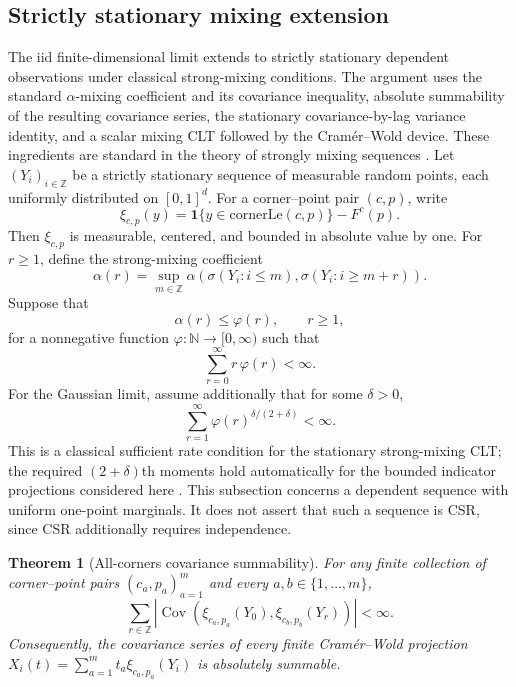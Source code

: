 \documentclass[pdflatex]{sn-jnl}
\theoremstyle{thmstyleone}
\newtheorem{theorem}{Theorem}[section]
\theoremstyle{thmstyletwo}
\theoremstyle{thmstylethree}
\newcommand{\Z}{\mathbb{Z}}
\newcommand{\N}{\mathbb{N}}
\DeclareMathOperator{\Cov}{Cov}
\begin{document}
\subsection{Strictly stationary mixing extension}\label{sec:mixing-extension}

The iid finite-dimensional limit extends to strictly stationary dependent observations under classical strong-mixing conditions. The argument uses the standard $\alpha$-mixing coefficient and its covariance inequality, absolute summability of the resulting covariance series, the stationary covariance-by-lag variance identity, and a scalar mixing CLT followed by the Cram\'er--Wold device. These ingredients are standard in the theory of strongly mixing sequences \cite{Ibragimov1962,Doukhan1994,Bradley2005,Rio2017}. Let $(Y_i)_{i\in\Z}$ be a strictly stationary sequence of measurable random points, each uniformly distributed on $[0,1]^d$. For a corner--point pair $(c,p)$, write
\[
  \xi_{c,p}(y)=\mathbf 1\{y\in\mathrm{cornerLe}(c,p)\}-F^c(p).
\]
Then $\xi_{c,p}$ is measurable, centered, and bounded in absolute value by one. For $r\ge1$, define the strong-mixing coefficient
\[
  \alpha(r)=\sup_{m\in\Z}
  \alpha\!\left(
    \sigma(Y_i:i\le m),
    \sigma(Y_i:i\ge m+r)
  \right).
\]
Suppose that
\begin{equation}\label{eq:mixing-rate}
  \alpha(r)\le\varphi(r),\qquad r\ge1,
\end{equation}
for a nonnegative function $\varphi:\N\to[0,\infty)$ such that
\begin{equation}\label{eq:weighted-mixing-summability}
  \sum_{r=0}^{\infty}r\,\varphi(r)<\infty.
\end{equation}
For the Gaussian limit, assume additionally that for some $\delta>0$,
\begin{equation}\label{eq:mixing-clt-summability}
  \sum_{r=1}^{\infty}\varphi(r)^{\delta/(2+\delta)}<\infty.
\end{equation}
This is a classical sufficient rate condition for the stationary strong-mixing CLT; the required $(2+\delta)$th moments hold automatically for the bounded indicator projections considered here \cite{Ibragimov1962,Doukhan1994,Rio2017}. This subsection concerns a dependent sequence with uniform one-point marginals. It does not assert that such a sequence is CSR, since CSR additionally requires independence.

\begin{theorem}[All-corners covariance summability]\label{thm:mixing-cov-summable}
For any finite collection of corner--point pairs $(c_a,p_a)_{a=1}^m$ and every $a,b\in\{1,\dots,m\}$,
\[
  \sum_{r\in\Z}
  \left|\Cov\!\left(
    \xi_{c_a,p_a}(Y_0),
    \xi_{c_b,p_b}(Y_r)
  \right)\right|<\infty.
\]
Consequently, the covariance series of every finite Cram\'er--Wold projection $X_i(t)=\sum_{a=1}^m t_a\xi_{c_a,p_a}(Y_i)$ is absolutely summable.
\end{theorem}
\end{document}
